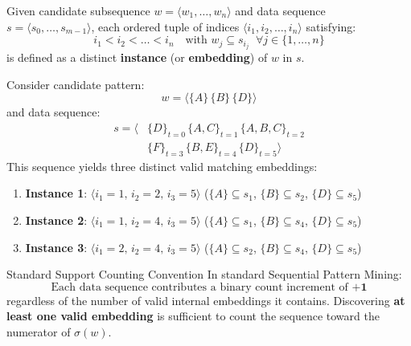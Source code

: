 \begin{definition}
Given candidate subsequence $w = \langle w_1, \dots, w_n \rangle$ and data sequence $s = \langle s_0, \dots, s_{m-1} \rangle$, each ordered tuple of indices $\langle i_1, i_2, \dots, i_n \rangle$ satisfying:
\begin{equation}
i_1 < i_2 < \dots < i_n \quad \text{with } w_j \subseteq s_{i_j} \;\; \forall j \in \{1, \dots, n\}
\end{equation}
is defined as a distinct \textbf{instance} (or \textbf{embedding}) of $w$ in $s$.
\end{definition}

\begin{example}
Consider candidate pattern:
\begin{equation*}
w = \langle \{A\} \, \{B\} \, \{D\} \rangle
\end{equation*}
and data sequence:
\begin{equation}
\begin{split}
s = \langle &\{D\}_{t=0} \, \{A, C\}_{t=1} \, \{A, B, C\}_{t=2} \\
&\{F\}_{t=3} \, \{B, E\}_{t=4} \, \{D\}_{t=5} \rangle
\end{split}
\end{equation}
This sequence yields three distinct valid matching embeddings:
\begin{enumerate}
    \item \textbf{Instance 1}: $\langle i_1 = 1, \, i_2 = 2, \, i_3 = 5 \rangle$
    ($\{A\} \subseteq s_1$, $\{B\} \subseteq s_2$, $\{D\} \subseteq s_5$)
    \item \textbf{Instance 2}: $\langle i_1 = 1, \, i_2 = 4, \, i_3 = 5 \rangle$
    ($\{A\} \subseteq s_1$, $\{B\} \subseteq s_4$, $\{D\} \subseteq s_5$)
    \item \textbf{Instance 3}: $\langle i_1 = 2, \, i_2 = 4, \, i_3 = 5 \rangle$
    ($\{A\} \subseteq s_2$, $\{B\} \subseteq s_4$, $\{D\} \subseteq s_5$)
\end{enumerate}
\end{example}

\begin{alertblock}{Standard Support Counting Convention}
    In standard Sequential Pattern Mining:
    \begin{equation*}
    \text{Each data sequence contributes a binary count increment of } \mathbf{+1}
    \end{equation*}
    regardless of the number of valid internal embeddings it contains. Discovering \textbf{at least one valid embedding} is sufficient to count the sequence toward the numerator of $\sigma(w)$.
\end{alertblock}

